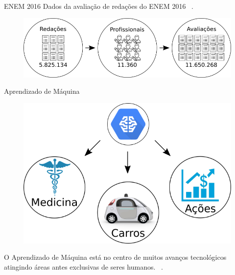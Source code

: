 \documentclass[10pt]{beamer}
\begin{document}
\begin{frame}[fragile]{ENEM 2016}
Dados da avaliação de redações do ENEM 2016 ~\cite{paq_a:2016}.

\begin{figure}[H]
\begin{center}
    \includegraphics[scale=0.52]{images/enem_2016.png}
\end{center}
\end{figure}

\end{frame}

\begin{frame}[fragile]{Aprendizado de Máquina}
\begin{figure}[H]
\begin{center}
    \includegraphics[scale=0.52]{images/machine_learn.png}
\end{center}
\end{figure}

O Aprendizado de Máquina está no centro de muitos avanços tecnológicos atingindo áreas antes exclusivas de seres humanos. ~\cite{waymo:2017}.
\end{frame}
\end{document}
